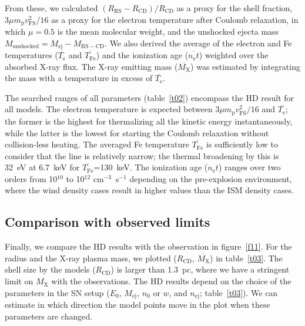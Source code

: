 \documentclass[]{pasj01}
\begin{document}
From these, we calculated $(R_{\mathrm{RS}}-R_{\mathrm{CD}})/R_{\mathrm{CD}}$ as a proxy
for the shell fraction, $3 \mu m_{\mathrm{p}}v_{\mathrm{FS}}^2/16$ as a proxy for the
electron temperature after Coulomb relaxation, in which $\mu=0.5$ is the mean molecular
weight, and the unshocked ejecta mass $M_{\mathrm{unshocked}} = M_{\mathrm{ej}} -
M_{\mathrm{RS-CD}}$. We also derived the average of the electron and Fe temperatures
($\overline{T_{\mathrm{e}}}$ and $\overline{T_{\mathrm{Fe}}}$) and the ionization age
($\overline{n_{\mathrm{e}}t}$) weighted over the absorbed X-ray flux. The X-ray emitting
mass ($\overline{M_{\mathrm{X}}}$) was estimated by integrating the mass with a
temperature in excess of $\overline{T_{\mathrm{e}}}$.

The searched ranges of all parameters (table~\ref{t02}) encompass the HD result for
all models. The electron temperature is expected between $3 \mu
m_{\mathrm{p}}v_{\mathrm{FS}}^2/16$ and $\overline{T_{\mathrm{e}}}$; the former is the
highest for thermalizing all the kinetic energy instantaneously, while the latter is the
lowest for starting the Coulomb relaxation without collision-less heating.  The averaged
Fe temperature $\overline{T_{\mathrm{Fe}}}$ is sufficiently low to consider that the
line is relatively narrow; the thermal broadening by this is 32~eV at 6.7~keV for
$\overline{T_{\mathrm{Fe}}}$=130~keV. The ionization age ($n_{\mathrm{e}}t$) ranges over
two orders from 10$^{10}$ to 10$^{12}$ cm$^{-3}$~s$^{-1}$ depending on the pre-explosion
environment, where the wind density cases result in higher values than the ISM density
cases.


\subsection{Comparison with observed limits}\label{s4-4}
Finally, we compare the HD results with the observation in figure~\ref{f11}. For the
radius and the X-ray plasma mass, we plotted ($R_{\mathrm{CD}}$,
$\overline{M_{\mathrm{X}}}$) in table~\ref{t03}. The shell size by the models
($R_{\mathrm{CD}}$) is larger than 1.3~pc, where we have a stringent limit on
$M_{\mathrm{X}}$ with the observations. The HD results depend on the choice of the
parameters in the SN setup ($E_{0}$, $M_{\mathrm{ej}}$, $n_{0}$ or $w$, and
$n_{\mathrm{ej}}$; table~\ref{t03}). We can estimate in which direction the model points
move in the plot when these parameters are changed.
\end{document}
